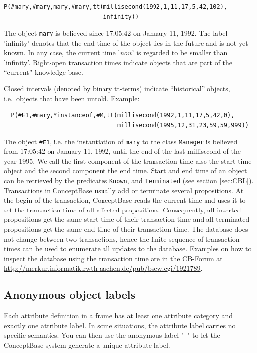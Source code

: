 \begin{verbatim}
P(#mary,#mary,mary,#mary,tt(millisecond(1992,1,11,17,5,42,102),
                            infinity))
\end{verbatim}


The object {\tt mary} is believed since 17:05:42 on January 11, 1992. The
label 'infinity' denotes that the end time of the object lies in the
future and is not yet known. In any case, the current time '{\it now}' is regarded
to be smaller than 'infinity'.
Right-open transaction times indicate objects that are part of the ``current'' knowledge base.

Closed intervals (denoted by binary tt-terms) indicate ``historical'' objects, i.e.\
objects that have been untold.
Example:

\begin{verbatim}
  P(#E1,#mary,*instanceof,#M,tt(millisecond(1992,1,11,17,5,42,0),
                                millisecond(1995,12,31,23,59,59,999))
\end{verbatim}

The object {\tt \#E1}, i.e. the instantiation  of {\tt mary} to the class {\tt Manager}
is believed from 17:05:42 on January 11, 1992, until the end of the last millisecond
of the year 1995. We call the first component of the transaction time also the start time
object and the second component the end time.
Start and end time of an object can be retrieved by the predicates {\tt Known},
and {\tt Terminated} (see section \ref{sec:CBL}).
Transactions in ConceptBase usually add or terminate several propositions. At the begin
of the transaction, ConceptBase reads the current time and uses it to set
the transaction time of all affected propositions. Consequently, all inserted propositions get
the same start time of their transaction time and all terminated propositions
get the same end time of their transaction time. The database does not change between two transactions,
hence the finite sequence of transaction times can be used to enumerate all updates
to the database. Examples on how to inspect the database using the transaction time are in
the CB-Forum at \url{http://merkur.informatik.rwth-aachen.de/pub/bscw.cgi/1921789}.


\subsection{Anonymous object labels}
\label{sec:anonlabel}

Each attribute definition in a frame has at least one attribute category and exactly one attribute
label. In some situations, the attribute label carries no specific semantics. You can then
use the anonymous label "{\tt \_}" to let the ConceptBase system generate a unique attribute label.

